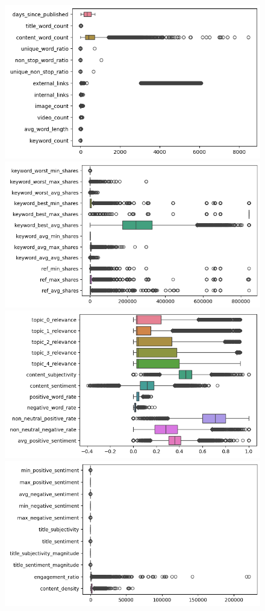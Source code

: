 \documentclass{article}
\begin{document}
\begin{figure}[htb]
    \centering
    \includegraphics[scale=0.33]{news_popularity/analysis/numeric/boxplot1.png}
    \includegraphics[scale=0.33]{news_popularity/analysis/numeric/boxplot2.png}
    \includegraphics[scale=0.33]{news_popularity/analysis/numeric/boxplot3.png}
    \includegraphics[scale=0.33]{news_popularity/analysis/numeric/boxplot4.png}

\end{figure}
\end{document}
